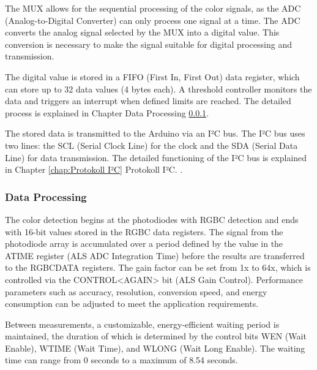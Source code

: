 The MUX allows for the sequential processing of the color signals, as the ADC (Analog-to-Digital Converter) can only process one signal at a time.
The ADC converts the analog signal selected by the MUX into a digital value. This conversion is necessary to make the signal suitable for digital processing and transmission.

The digital value is stored in a FIFO (First In, First Out) data register, which can store up to 32 data values (4 bytes each). A threshold controller monitors the data and triggers an interrupt when defined limits are reached. The detailed process is explained in Chapter Data Processing \ref{chap:Data Processing}.

The stored data is transmitted to the Arduino via an I²C bus. The I²C bus uses two lines: the SCL (Serial Clock Line) for the clock and the SDA (Serial Data Line) for data transmission. The detailed functioning of the I²C bus is explained in Chapter \ref{chap:Protokoll I²C} Protokoll I²C.
\cite{Avago:2015}.

\subsubsection{Data Processing}
\label{chap:Data Processing}

The color detection begins at the photodiodes with RGBC detection and ends with 16-bit values stored in the RGBC data registers. The signal from the photodiode array is accumulated over a period defined by the value in the ATIME register (ALS ADC Integration Time) before the results are transferred to the RGBCDATA registers. The gain factor can be set from 1x to 64x, which is controlled via the CONTROL<AGAIN> bit (ALS Gain Control). Performance parameters such as accuracy, resolution, conversion speed, and energy consumption can be adjusted to meet the application requirements.

Between measurements, a customizable, energy-efficient waiting period is maintained, the duration of which is determined by the control bits WEN (Wait Enable), WTIME (Wait Time), and WLONG (Wait Long Enable). The waiting time can range from 0 seconds to a maximum of 8.54 seconds.

